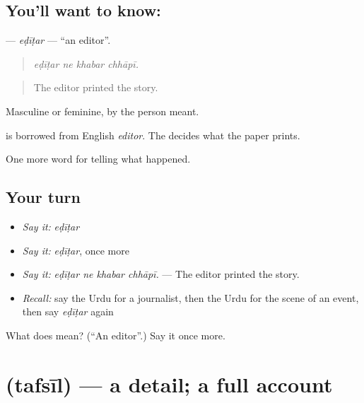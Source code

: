 \subsection*{You'll want to know: }
\textbf{} — \emph{eḍīṭar} — \textquotedblleft{}an editor\textquotedblright{}.

\begin{quote}
   
\end{quote}

\begin{quote}
\emph{eḍīṭar ne khabar chhāpī.}
\end{quote}

\begin{quote}
The editor printed the story.
\end{quote}

Masculine or feminine, by the person meant.

\begin{cousinweb}
is borrowed from English \emph{editor}. The \textbf{} decides what the paper prints.
\end{cousinweb}

\begin{grammarlens}[title={What you've built}]
One more word for telling what happened.
\end{grammarlens}

\subsection*{Your turn}
\begin{itemize}
\raggedright
  \item \emph{Say it:} \emph{eḍīṭar}
  \item \emph{Say it:} \emph{eḍīṭar}, once more
  \item \emph{Say it:} \emph{eḍīṭar ne khabar chhāpī.} — The editor printed the story.
  \item \emph{Recall:} say the Urdu for a journalist, then the Urdu for the scene of an event, then say \emph{eḍīṭar} again
\end{itemize}

\begin{tcolorbox}[breakable,colback=teal!4,colframe=teal!35!black,title={Before you move on}]
What does  mean? (\textquotedblleft{}An editor\textquotedblright{}.) Say it once more.
\end{tcolorbox}
\section[\texorpdfstring{\ur{تفصیل} (tafsīl)}{تفصیل (tafsīl)}]{ (tafsīl) — a detail; a full account}

